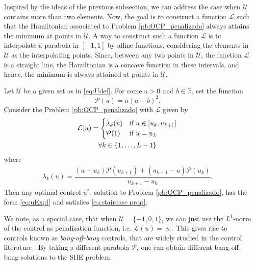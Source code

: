 \documentclass[twocolumn]{autart}    %
\begin{document}
Inspired by the ideas of the previous subsection, we can address the case when $\mathcal{U}$ contains more than two elements. 
Now, the goal is to construct a function $\mathcal{L}$ such that the Hamiltonian associated to Problem \ref{pb:OCP_penalizado} always attains the minimum at points in $\mathcal{U}$.
A way to construct such a function $\mathcal{L}$ is to interpolate a parabola in $[-1,1]$ by affine functions, considering the elements in $\mathcal{U}$ as the interpolating points.  Since, between any two points in $\mathcal{U}$,  the function $\mathcal{L}$ is a straight line,  the Hamiltonian is a concave function in these intervals, and hence, the minimum is always attained at points in $\mathcal{U}$.

\vspace{1em}
\begin{theorem}\label{th:PLP}
Let $\mathcal{U}$ be a given set as in \eqref{eq:Udef}.
For some $a>0$ and $b\in \mathbb{R}$, set the function
$$
\mathcal{P}(u) = a (u-b)^2.
$$
Consider the Problem \ref{pb:OCP_penalizado} with $\mathcal{L}$ given by
    \begin{gather}\label{eq:PLP}
        \mathcal{L}(u) = \begin{cases}
            \lambda_k(u) & \text{if }  u \in [u_k,u_{k+1}[ \\
            \mathcal{P}(1) & \text{if } u = u_{L} 
        \end{cases} \\
        \notag \forall k \in \{1,\dots,L-1\} 
    \end{gather}
    where 
    \begin{gather}\label{eq:lambda k}
        \lambda_k(u) = \dfrac{ (u-u_k)\mathcal{P}(u_{k+1}) + (u_{k+1}- u) \mathcal{P}(u_k)}{u_{k+1} - u_k}.
    \end{gather}
   Then any optimal control $u^\ast$,  solution to Problem \ref{pb:OCP_penalizado}, has the form \eqref{eq:uExpl} and satisfies \eqref{eq:staircase prop}.
\end{theorem}

\bigskip

\begin{remark}
We note, as a special case, that when  $\mathcal{U}= \{-1,0,1\}$, we can just use the $L^1$-norm of the control as penalization function, i.e. $\mathcal{L}(u) = |u|$. 
This gives rise to controls known as \emph{bang-off-bang} controls,  that are widely studied in the control literature \cite{Wang2020}.
By taking a different parabola $\mathcal{P}$, one can obtain different bang-off-bang solutions to the SHE problem.
\end{remark}
\end{document}
